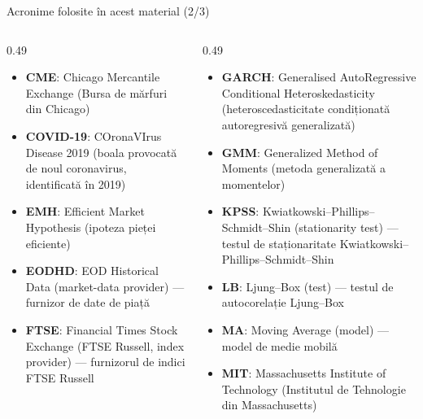 \begin{frame}{Acronime folosite în acest material (2/3)}
\begin{columns}[T]
\begin{column}{0.49\textwidth}
\begin{itemize}\setlength{\itemsep}{0pt}
    \item \textbf{CME}: Chicago Mercantile Exchange (Bursa de mărfuri din Chicago)
    \item \textbf{COVID-19}: COronaVIrus Disease 2019 (boala provocată de noul coronavirus, identificată în 2019)
    \item \textbf{EMH}: Efficient Market Hypothesis (ipoteza pieței eficiente)
    \item \textbf{EODHD}: EOD Historical Data (market-data provider) — furnizor de date de piață
    \item \textbf{FTSE}: Financial Times Stock Exchange (FTSE Russell, index provider) — furnizorul de indici FTSE Russell
\end{itemize}
\end{column}
\begin{column}{0.49\textwidth}
\begin{itemize}\setlength{\itemsep}{0pt}
    \item \textbf{GARCH}: Generalised AutoRegressive Conditional Heteroskedasticity (heteroscedasticitate condiționată autoregresivă generalizată)
    \item \textbf{GMM}: Generalized Method of Moments (metoda generalizată a momentelor)
    \item \textbf{KPSS}: Kwiatkowski–Phillips–Schmidt–Shin (stationarity test) — testul de staționaritate Kwiatkowski–Phillips–Schmidt–Shin
    \item \textbf{LB}: Ljung–Box (test) — testul de autocorelație Ljung–Box
    \item \textbf{MA}: Moving Average (model) — model de medie mobilă
    \item \textbf{MIT}: Massachusetts Institute of Technology (Institutul de Tehnologie din Massachusetts)
\end{itemize}
\end{column}
\end{columns}
\end{frame}
